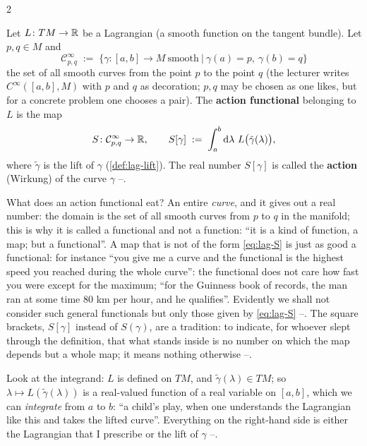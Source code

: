 \begin{paracol}{2}
\begin{definition}\label{def:lag-action}
Let $L\colon TM\to\mathbb{R}$ be a Lagrangian (a smooth function on the tangent bundle). Let $p,q\in M$ and
\begin{equation}\label{eq:lag-curves}
  \mathcal C^\infty_{p,q}\;:=\;\bigl\{\gamma\colon[a,b]\to M\ \text{smooth}\ \big|\ \gamma(a)=p,\ \gamma(b)=q\bigr\}
\end{equation}
the set of all smooth curves from the point $p$ to the point $q$ (the lecturer writes $C^\infty([a,b],M)$ with $p$ and $q$ as decoration; $p,q$ may be chosen as one likes, but for a concrete problem one chooses a pair). The \textbf{action functional} belonging to $L$ is the map
\begin{equation}\label{eq:lag-S}
  S\colon\mathcal C^\infty_{p,q}\to\R,\qquad S[\gamma]\;:=\;\int_a^b\mathrm d\lambda\ L\bigl(\tilde\gamma(\lambda)\bigr),
\end{equation}
where $\tilde\gamma$ is the lift of $\gamma$ (\cref{def:lag-lift}). The real number $S[\gamma]$ is called the \textbf{action} (Wirkung) of the curve $\gamma$ --.
\end{definition}

\begin{coursenote}\label{cn:lag-functional}
What does an action functional eat? An entire \emph{curve}, and it gives out a real number: the domain is the set of all smooth curves from $p$ to $q$ in the manifold; this is why it is called a functional and not a function: ``it is a kind of function, a map; but a functional''. A map that is not of the form \eqref{eq:lag-S} is just as good a functional: for instance ``you give me a curve and the functional is the highest speed you reached during the whole curve'': the functional does not care how fast you were except for the maximum; ``for the Guinness book of records, the man ran at some time 80 km per hour, and he qualifies''. Evidently we shall not consider such general functionals but only those given by \eqref{eq:lag-S} --.
The square brackets, $S[\gamma]$ instead of $S(\gamma)$, are a tradition: to indicate, for whoever slept through the definition, that what stands inside is no number on which the map depends but a whole map; it means nothing otherwise --.
\end{coursenote}
Look at the integrand: $L$ is defined on $TM$, and $\tilde\gamma(\lambda)\in TM$; so $\lambda\mapsto L(\tilde\gamma(\lambda))$ is a real-valued function of a real variable on $[a,b]$, which we can \emph{integrate} from $a$ to $b$: ``a child's play, when one understands the Lagrangian like this and takes the lifted curve''. Everything on the right-hand side is either the Lagrangian that I prescribe or the lift of $\gamma$ --.


\end{paracol}
